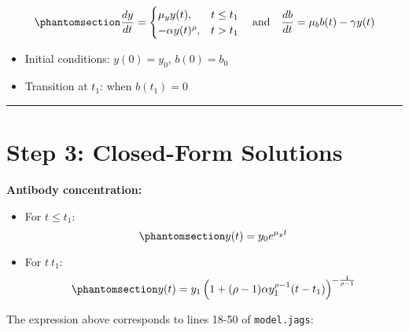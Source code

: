 \documentclass[
]{article}
\providecommand{\tightlist}{%
  \setlength{\itemsep}{0pt}\setlength{\parskip}{0pt}}\usepackage{longtable,booktabs,array}
\begin{document}
\begin{equation}\phantomsection\label{eq-3}{
\frac{dy}{dt} = 
\begin{cases}
\mu_y y(t), & t \leq t_1 \\
- \alpha y(t)^\rho, & t > t_1
\end{cases}
\quad \text{and} \quad
\frac{db}{dt} = \mu_b b(t) - \gamma y(t)
}\end{equation}

\begin{itemize}
\tightlist
\item
  Initial conditions: \(y(0) = y_0\), \(b(0) = b_0\)
\item
  Transition at \(t_1\): when \(b(t_1) = 0\)
\end{itemize}

\begin{center}\rule{0.5\linewidth}{0.5pt}\end{center}

\section{Step 3: Closed-Form
Solutions}\label{step-3-closed-form-solutions}

\textbf{Antibody concentration:}

\begin{itemize}
\tightlist
\item
  For \(t \leq t_1\): \begin{equation}\phantomsection\label{eq-4}{
  y(t) = y_0 e^{\mu_y t}
  }\end{equation}
\item
  For \(t \> t_1\): \begin{equation}\phantomsection\label{eq-5}{
  y(t) = y_1 \left(1 + (\rho-1)\alpha y_1^{\rho-1}(t-t_1)\right)^{-\frac{1}{\rho-1}}
  }\end{equation}
\end{itemize}

The expression above corresponds to lines 18-50 of \texttt{model.jags}:
\end{document}
